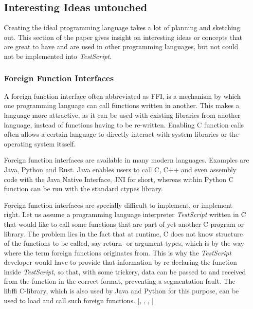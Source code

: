\documentclass[12pt,a4paper]{article}
\newcommand{\name}{\emph{TestScript}}
\begin{document}
\subsection{Interesting Ideas untouched}
Creating the ideal programming language takes a lot of planning and sketching
out. This section of the paper gives insight on interesting ideas or concepts
that are great to have and are used in other programming languages, but not 
could not be implemented into \name{}.

\subsubsection{Foreign Function Interfaces}
A foreign function interface often abbreviated as FFI,
is a mechanism by which one programming language can call functions written 
in another. This makes a language more attractive, as it can be used with
existing libraries from another language, instead of functions having to be
re-written. Enabling C function calls often allows a certain language to
directly interact with system libraries or the operating system itsself.

Foreign function interfaces are available in many modern languages.
Examples are Java, Python and Rust.
Java enables users to call C, C++ and even assembly code with the Java Native
Interface, JNI for short, whereas within Python C function can
be run with the standard ctypes library.

Foreign function interfaces are specially difficult to implement, or implement
right. Let us assume a programming language interpreter \name{} written in C that
would like to call some functions that are part of yet another C program or
library. The problem lies in the fact that at runtime, C does not know
structure of the functions to be called, say return- or argument-types, which
is by the way where the term foreign functions originates from. This is why the
\name{} developer would have to provide that information by re-declaring the
function inside \name{}, so that, with some trickery, data can be passed to and
received from the function in the correct format, preventing a segmentation
fault. The libffi C-library, which is also used by Java and
Python for this purpose, can be used to load and call such foreign functions.
[, , , ]
\end{document}
